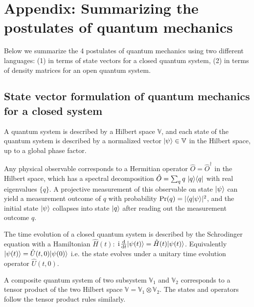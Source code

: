 \section{Appendix: Summarizing the postulates of quantum mechanics}

Below we summarize the 4 postulates of quantum mechanics using two different languages: (1) in terms of state vectors for a closed quantum system, (2) in terms of density matrices for an open quantum system. 

\subsection{State vector formulation of quantum mechanics for a closed system}

\begin{pos}
    A quantum system is described by a Hilbert space $\mathbb{V}$, and each state of the quantum system is described by a normalized vector $|{\psi}\rangle\in\mathbb{V}$ in the Hilbert space, up to a global phase factor. 
\end{pos}

\begin{pos}
    Any physical observable corresponds to a Hermitian operator $\hat O=\hat O^\dagger$ in the Hilbert space, which has a spectral decomposition $\hat O=\sum_qq~|q\rangle\langle q|$ with real eigenvalues $\{q\}$. A projective measurement of this observable on state $|{\psi}\rangle$ can yield a measurement outcome of $q$ with probability $\text{Pr}(q)=|\langle{q|\psi}\rangle|^2$, and the initial state $|{\psi}\rangle$ collapses into state $|{q}\rangle$ after reading out the measurement outcome $q$. 
\end{pos}


\begin{pos}
    The time evolution of a closed quantum system is described by the Schrodinger equation with a Hamiltonian $\hat H(t)$: $\hspace{1pt}\mathrm{i}\hspace{1pt}\frac{\mathrm{d}{}}{\mathrm{d} t}|{\psi(t)}\rangle=\hat H(t)|{\psi(t)}\rangle$. Equivalently $|{\psi(t)}\rangle=\hat U(t,0)|{\psi(0)}\rangle$ i.e. the state evolves under a unitary time evolution operator $\hat U(t,0)$.  
\end{pos}

\begin{pos}
    A composite quantum system of two subsystem $\mathbb{V}_1$ and $\mathbb{V}_2$ corresponds to a tensor product of the two Hilbert space $\mathbb{V}=\mathbb{V}_1\otimes \mathbb{V}_2$. The states and operators follow the tensor product rules similarly. 
\end{pos}


